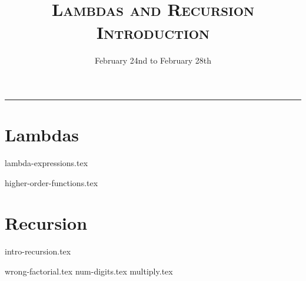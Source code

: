 \documentclass{exam}
\title{\textsc{Lambdas and Recursion Introduction}}
\date{February 24nd to February 28th}
\begin{document}
\maketitle
\rule{\textwidth}{0.15em}
\fontsize{12}{15}\selectfont


\section{Lambdas}
{lambda-expressions.tex}
\newpage
\begin{questions}
{higher-order-functions.tex}

\end{questions}
\newpage
\section{Recursion}
{intro-recursion.tex}
\begin{questions}
\newpage
{wrong-factorial.tex}
{num-digits.tex}
\newpage
{multiply.tex}

\end{questions}
\end{document}
